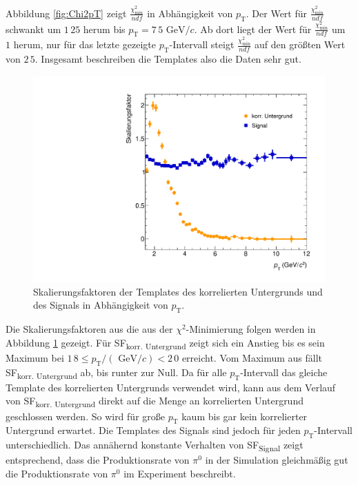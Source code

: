 \newline
Abbildung \ref{fig:Chi2pT} zeigt $\frac{\chi^{2}_\text{min}}{ndf}$ in Abhängigkeit von $p_{\text{T}}$.
Der Wert für $\frac{\chi^{2}_\text{min}}{ndf}$ schwankt um $1\,25$ herum bis $p_{\text{T}} = 7\,5\text{ GeV}/c$.
Ab dort liegt der Wert für $\frac{\chi^{2}_\text{min}}{ndf}$ um $1$ herum, nur für das letzte gezeigte $p_{\text{T}}$-Intervall steigt $\frac{\chi^{2}_\text{min}}{ndf}$ auf den größten Wert von $2\,5$.
Insgesamt beschreiben die Templates also die Daten sehr gut.
\begin{figure}[tp]
\centering
\includegraphics[width=.65\linewidth]{SF_Data_2016.pdf}
\caption{Skalierungsfaktoren der Templates des korrelierten Untergrunds und des Signals in Abhängigkeit von $p_{\text{T}}$.
}
\label{fig:SF}
\end{figure}
\newline
Die Skalierungsfaktoren aus die aus der $\chi^{2}$-Minimierung folgen werden in Abbildung \ref{fig:SF} gezeigt.
Für SF\textsubscript{korr. Untergrund} zeigt sich ein Anstieg bis es sein Maximum bei $1\,8 \leq p_{\text{T}}/(\text{ GeV}/c) < 2\,0$ erreicht.
Vom Maximum aus fällt SF\textsubscript{korr. Untergrund} ab, bis runter zur Null.
Da für alle $p_{\text{T}}$-Intervall das gleiche Template des korrelierten Untergrunds verwendet wird, kann aus dem Verlauf von SF\textsubscript{korr. Untergrund} direkt auf die Menge an korrelierten Untergrund geschlossen werden.
So wird für große $p_{\text{T}}$ kaum bis gar kein korrelierter Untergrund erwartet.
\newline
Die Templates des Signals sind jedoch für jeden $p_{\text{T}}$-Intervall unterschiedlich.
Das annähernd konstante Verhalten von SF\textsubscript{Signal} zeigt entsprechend, dass die Produktionsrate von $\pi^{0}$ in der Simulation gleichmäßig gut die Produktionsrate von $\pi^{0}$ im Experiment beschreibt.
